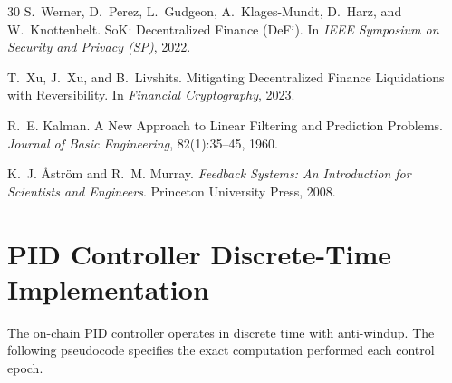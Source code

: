 \documentclass[11pt,a4paper]{article}
\begin{document}
\begin{thebibliography}{30}
S.~Werner, D.~Perez, L.~Gudgeon, A.~Klages-Mundt, D.~Harz, and W.~Knottenbelt.
\newblock SoK: Decentralized Finance (DeFi).
\newblock In \emph{IEEE Symposium on Security and Privacy (SP)}, 2022.

T.~Xu, J.~Xu, and B.~Livshits.
\newblock Mitigating Decentralized Finance Liquidations with Reversibility.
\newblock In \emph{Financial Cryptography}, 2023.

R.~E. Kalman.
\newblock A New Approach to Linear Filtering and Prediction Problems.
\newblock \emph{Journal of Basic Engineering}, 82(1):35--45, 1960.

K.~J. {\AA}str{\"o}m and R.~M. Murray.
\newblock \emph{Feedback Systems: An Introduction for Scientists and Engineers}.
\newblock Princeton University Press, 2008.

\end{thebibliography}


\appendix

\section{PID Controller Discrete-Time Implementation}
\label{app:pid_impl}

The on-chain PID controller operates in discrete time with anti-windup.
The following pseudocode specifies the exact computation performed each control epoch.
\end{document}
